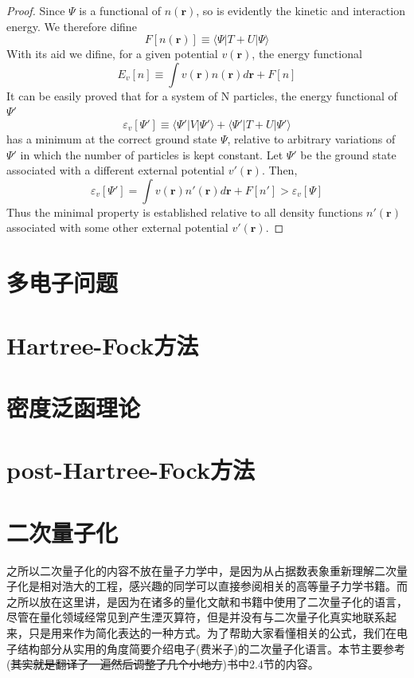 \documentclass[12pt,a4paper,openany,twoside]{book}
\numberwithin{equation}{section}
\newcommand{\bracketl}[3]{\langle #1 | #2 | #3 \rangle}
\begin{document}
  \begin{proof}
  Since $\Psi$ is a functional of $n(\textbf{r})$, so is evidently the kinetic and interaction energy. We therefore difine 
  \begin{equation}
  F[n(\textbf{r})] \equiv \bracketl{\Psi}{T+U}{\Psi}
  \end{equation}
  With its aid we difine, for a given potential $v(\textbf{r})$, the energy functional
  \begin{equation}
  E_v[n]\equiv \int v(\textbf{r})n(\textbf{r})d\textbf{r} + F[n]
  \end{equation}
  It can be easily proved that for a system of N particles, the energy functional of $\Psi'$
  \begin{equation}
  \varepsilon_v[\Psi']\equiv\bracketl{\Psi'}{V}{\Psi'}+\bracketl{\Psi'}{T+U}{\Psi'}
  \end{equation}
  has a minimum at the correct ground state $\Psi$, relative to arbitrary variations of $\Psi'$ in which the number of particles is kept constant. Let $\Psi'$ be the ground state associated with a different external potential $v'(\textbf{r})$. Then,
  \begin{equation}
  \varepsilon_v[\Psi']=\int v(\textbf{r})n'(\textbf{r})d\textbf{r}+F[n']>\varepsilon_v[\Psi]
  \end{equation}
  Thus the minimal property is established relative to all density functions $n'(\textbf{r})$ associated with some other external potential $v'(\textbf{r})$.\cite{PhysRev.136.B864}
  \end{proof}

  \section{多电子问题}
  \section{Hartree-Fock方法}
  \section{密度泛函理论}
  \section{post-Hartree-Fock方法}
  \section{二次量子化}
  之所以二次量子化的内容不放在量子力学中，是因为从占据数表象重新理解二次量子化是相对浩大的工程，感兴趣的同学可以直接参阅相关的高等量子力学书籍。而之所以放在这里讲，是因为在诸多的量化文献和书籍中使用了二次量子化的语言，尽管在量化领域经常见到产生湮灭算符，但是并没有与二次量子化真实地联系起来，只是用来作为简化表达的一种方式。为了帮助大家看懂相关的公式，我们在电子结构部分从实用的角度简要介绍电子(费米子)的二次量子化语言。本节主要参考(\sout{其实就是翻译了一遍然后调整了几个小地方})\cite{Szabo1989Modern}书中2.4节的内容。
\end{document}
